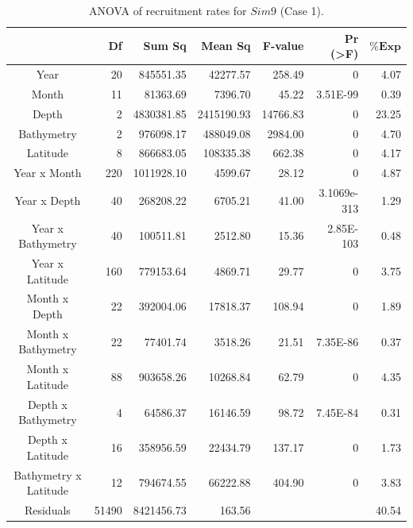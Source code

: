 \begin{table}[H]
\centering
\caption{ANOVA of recruitment rates for $Sim 9$ (Case 1).}
\begin{adjustbox}{width=0.9\textwidth}
\small
\begin{tabular}{c|r|r|r|r|r|r}
\toprule
                                  &
	\textbf{Df}                   &
	\textbf{Sum Sq}               &
	\textbf{Mean Sq}              &
	\textbf{F-value}    		   &
	\textbf{Pr (\textgreater{F})} &
	$\mathbf{\% Exp}$      \\
\midrule
Year                  & 20	 & 845551.35  & 42277.57   & 258.49	   & 0	         & 4.07\\
Month                 & 11	 & 81363.69	  & 7396.70    & 45.22	   & 3.51E-99	 &0.39  \\
Depth                 & 2	 & 4830381.85 & 2415190.93 & 14766.83 & 0 			 & 23.25 \\
Bathymetry            & 2	 & 976098.17  & 488049.08  & 2984.00  & 0	         &4.70 \\
Latitude              & 8	 & 866683.05  & 108335.38  & 662.38	   & 0			 & 4.17\\
Year x Month          & 220 & 1011928.10 &	4599.67    & 28.12    & 0	         & 4.87  \\
Year x Depth          & 40	 & 268208.22  & 6705.21	   & 41.00	   & 3.1069e-313 & 1.29 \\
Year x Bathymetry     & 40  & 100511.81  & 2512.80	   & 15.36	   & 2.85E-103	 & 0.48 \\
Year x Latitude       & 160 & 779153.64  &	4869.71	   & 29.77	   & 0	         & 3.75  \\
Month x Depth         & 22	 & 392004.06  & 17818.37  &108.94	   & 0	         & 1.89 \\
Month x Bathymetry    & 22	 & 77401.74	  & 3518.26	   &21.51	   & 7.35E-86	 & 0.37  \\
Month x Latitude      & 88	 & 903658.26  & 10268.84  & 62.79	   & 0	         & 4.35  \\
Depth x Bathymetry    & 4	 & 64586.37	  & 16146.59   &98.72	   & 7.45E-84	 & 0.31  \\
Depth x Latitude      & 16	 & 358956.59  & 22434.79  & 137.17	   & 0	         &1.73 \\
Bathymetry x Latitude & 12	 & 794674.55  & 66222.88  & 404.90	   & 0	         & 3.83  \\
Residuals             & 51490	& 8421456.73 &163.56  & & 						 & 40.54\\
\bottomrule
\end{tabular}
\end{adjustbox}
\label{Chap3ANOVAsim9}
\end{table}

